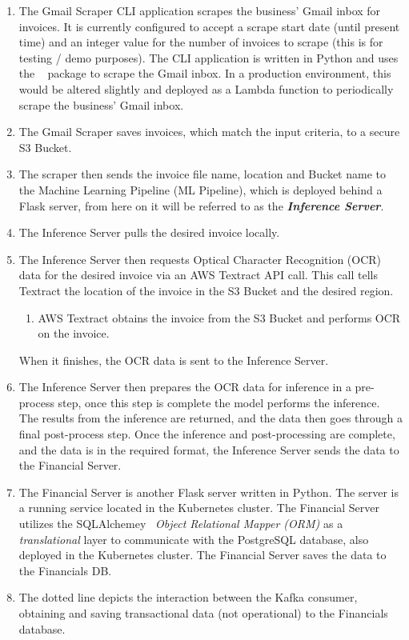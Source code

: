 \begin{enumerate} \label{enumerate:architecture}
	\item The Gmail Scraper CLI application scrapes the business' Gmail inbox for invoices.
	      It is currently configured to accept a scrape start date (until present time) and an
	      integer value for the number of invoices to scrape (this is for testing / demo purposes).
	      The CLI application is written in Python and uses the ~\autocite{rusevImboxPythonIMAP} package to scrape the
	      Gmail inbox.
	      \bigbreak
	      In a production environment, this would be altered slightly and deployed as a Lambda function
	      to periodically scrape the business' Gmail inbox.
	\item The Gmail Scraper saves invoices, which match the input criteria, to a secure S3 Bucket.
	\item The scraper then sends the invoice file name, location and Bucket name to the Machine Learning Pipeline (ML Pipeline),
	      which is deployed behind a Flask server, from here on it will be referred to as the \emph{\textbf{Inference Server}}.
	\item The Inference Server pulls the desired invoice locally.
	\item The Inference Server then requests Optical Character Recognition (OCR) data for the desired invoice via an AWS Textract API call.
	      This call tells Textract the location of the invoice in the S3 Bucket and the desired region.
	      \begin{enumerate}
		      \item AWS Textract obtains the invoice from the S3 Bucket and performs OCR on the invoice.
	      \end{enumerate}
	      When it finishes, the OCR data is sent to the Inference Server.
	\item The Inference Server then prepares the OCR data for inference in a pre-process step, once this step is complete the model
	      performs the inference.\\ The results from the inference are returned, and the data then goes through a final post-process step.
	      Once the inference and post-processing are complete, and the data is in the required format, the Inference Server sends the data
	      to the Financial Server.
	\item The Financial Server is another Flask server written in Python. The server is a running service located in the Kubernetes cluster.
	      The Financial Server utilizes the SQLAlchemey~\autocite{SQLAlchemyDatabaseToolkit} \emph{Object Relational Mapper (ORM)} as a
	      \emph{translational} layer to communicate with the PostgreSQL database, also deployed in the Kubernetes cluster.
	      The Financial Server saves the data to the Financials DB.
	\item The dotted line depicts the interaction between the Kafka consumer, obtaining and saving transactional data (not operational) to the
	      Financials database.
\end{enumerate}
